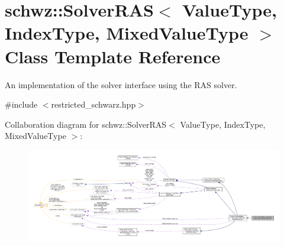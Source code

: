 \hypertarget{classschwz_1_1SolverRAS}{}\section{schwz\+:\+:Solver\+R\+AS$<$ Value\+Type, Index\+Type, Mixed\+Value\+Type $>$ Class Template Reference}
\label{classschwz_1_1SolverRAS}


An implementation of the solver interface using the R\+AS solver.  




{\ttfamily \#include $<$restricted\+\_\+schwarz.\+hpp$>$}



Collaboration diagram for schwz\+:\+:Solver\+R\+AS$<$ Value\+Type, Index\+Type, Mixed\+Value\+Type $>$\+:
\nopagebreak
\begin{figure}[H]
\begin{center}
\leavevmode
\includegraphics[width=350pt]{classschwz_1_1SolverRAS__coll__graph}
\end{center}
\end{figure}
